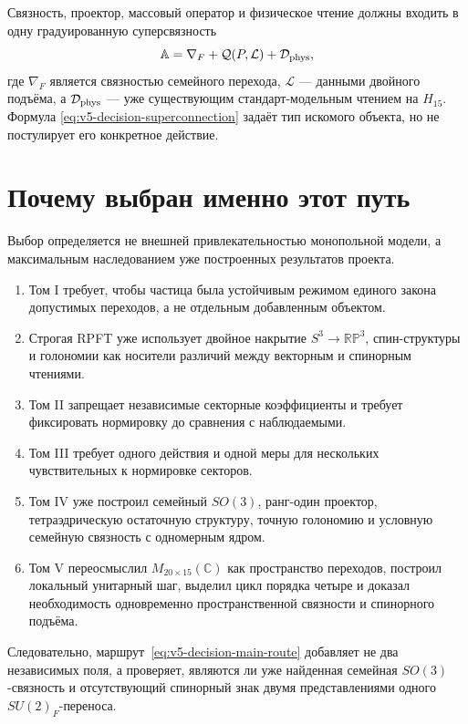 Связность, проектор, массовый оператор и физическое чтение должны входить
в одну градуированную суперсвязность
\begin{equation}
 \mathbb A=\nabla_F+\mathcal Q(P,\mathcal L)+\mathcal D_{\rm phys},
 \label{eq:v5-decision-superconnection}
\end{equation}
где $\nabla_F$ является связностью семейного перехода, $\mathcal L$ ---
данными двойного подъёма, а $\mathcal D_{\rm phys}$ --- уже существующим
стандарт-модельным чтением на $H_{15}$. Формула
\eqref{eq:v5-decision-superconnection} задаёт тип искомого объекта, но не
постулирует его конкретное действие.

\section{Почему выбран именно этот путь}

Выбор определяется не внешней привлекательностью монопольной модели, а
максимальным наследованием уже построенных результатов проекта.

\begin{enumerate}
 \item Том I требует, чтобы частица была устойчивым режимом единого закона
 допустимых переходов, а не отдельным добавленным объектом.
 \item Строгая RPFT уже использует двойное накрытие
 $S^3\to\mathbb{RP}^3$, спин-структуры и голономии как носители
 различий между векторным и спинорным чтениями.
 \item Том II запрещает независимые секторные коэффициенты и требует
 фиксировать нормировку до сравнения с наблюдаемыми.
 \item Том III требует одного действия и одной меры для нескольких
 чувствительных к нормировке секторов.
 \item Том IV уже построил семейный $SO(3)$, ранг-один проектор,
 тетраэдрическую остаточную структуру, точную голономию и условную
 семейную связность с одномерным ядром.
 \item Том V переосмыслил $M_{20\times15}(\mathbb C)$ как пространство
 переходов, построил локальный унитарный шаг, выделил цикл порядка четыре
 и доказал необходимость одновременно пространственной связности и
 спинорного подъёма.
\end{enumerate}

Следовательно, маршрут~\eqref{eq:v5-decision-main-route} добавляет не два
независимых поля, а проверяет, являются ли уже найденная семейная
$SO(3)$-связность и отсутствующий спинорный знак двумя представлениями
одного $SU(2)_F$-переноса.


